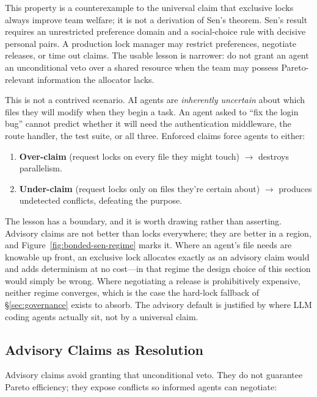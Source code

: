 \documentclass[11pt,a4paper]{article}
\theoremstyle{definition}
\theoremstyle{remark}
\begin{document}
This property is a counterexample to the universal claim that exclusive locks always improve team welfare; it is not a derivation of Sen's theorem. Sen's result requires an unrestricted preference domain and a social-choice rule with decisive personal pairs. A production lock manager may restrict preferences, negotiate releases, or time out claims. The usable lesson is narrower: do not grant an agent an unconditional veto over a shared resource when the team may possess Pareto-relevant information the allocator lacks.

This is not a contrived scenario. AI agents are \emph{inherently uncertain} about which files they will modify when they begin a task. An agent asked to ``fix the login bug'' cannot predict whether it will need the authentication middleware, the route handler, the test suite, or all three. Enforced claims force agents to either:
\begin{enumerate}[nosep]
  \item \textbf{Over-claim} (request locks on every file they might touch) $\rightarrow$ destroys parallelism.
  \item \textbf{Under-claim} (request locks only on files they're certain about) $\rightarrow$ produces undetected conflicts, defeating the purpose.
\end{enumerate}

The lesson has a boundary, and it is worth drawing rather than asserting. Advisory claims are not better than locks everywhere; they are better in a region, and Figure~\ref{fig:bonded-sen-regime} marks it. Where an agent's file needs are knowable up front, an exclusive lock allocates exactly as an advisory claim would and adds determinism at no cost---in that regime the design choice of this section would simply be wrong. Where negotiating a release is prohibitively expensive, neither regime converges, which is the case the hard-lock fallback of \S\ref{sec:governance} exists to absorb. The advisory default is justified by where LLM coding agents actually sit, not by a universal claim.



\subsection{Advisory Claims as Resolution}\label{sec:advisory}

Advisory claims avoid granting that unconditional veto. They do not guarantee Pareto efficiency; they expose conflicts so informed agents can negotiate:
\end{document}
